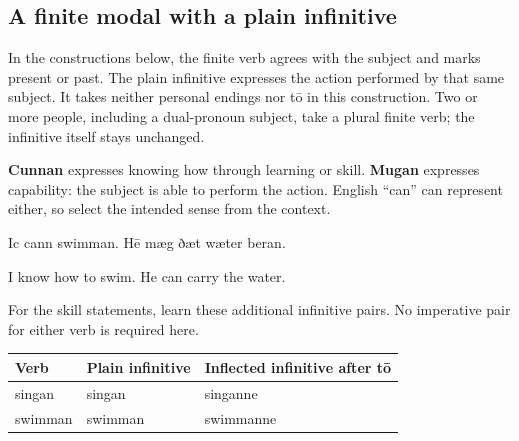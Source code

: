 \subsection*{A finite modal with a plain infinitive}

In the constructions below, the finite verb agrees with the subject and marks present or past. The plain infinitive expresses the action performed by that same subject. It takes neither personal endings nor tō in this construction. Two or more people, including a dual-pronoun subject, take a plural finite verb; the infinitive itself stays unchanged.

\textbf{Cunnan} expresses knowing how through learning or skill. \textbf{Mugan} expresses capability: the subject is able to perform the action. English “can” can represent either, so select the intended sense from the context.

Ic cann swimman. Hē mæg ðæt wæter beran.

I know how to swim. He can carry the water.

For the skill statements, learn these additional infinitive pairs. No imperative pair for either verb is required here.

\par\begingroup
\fontsize{10.5}{13.2}\selectfont
\setlength{\LTleft}{0pt}\setlength{\LTright}{\fill}
\noindent
\begin{tabular}{@{}>{\raggedright\arraybackslash}p{28.7mm}>{\raggedright\arraybackslash}p{36.45mm}>{\raggedright\arraybackslash}p{53.23mm}@{}}
\toprule
\textbf{Verb} & \textbf{Plain infinitive} & \textbf{Inflected infinitive after tō} \\
\midrule
singan & singan & singanne \\
swimman & swimman & swimmanne \\
\bottomrule
\end{tabular}
\par\endgroup

